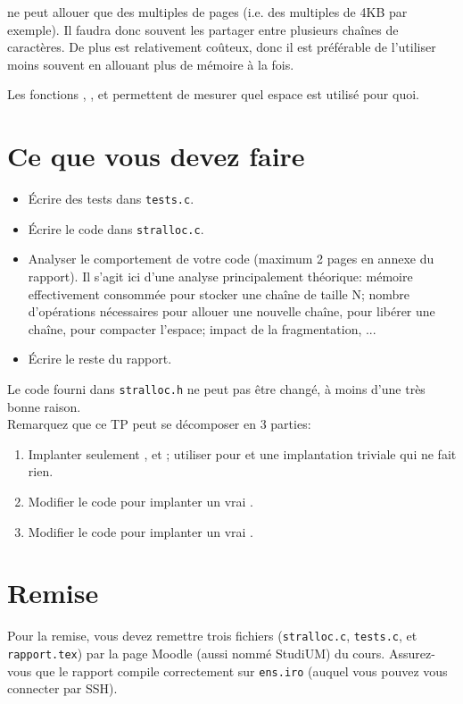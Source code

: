 \documentclass{article}
\begin{document}
 ne peut allouer que des multiples de pages (i.e. des multiples de
4KB par exemple).  Il faudra donc souvent les partager entre plusieurs
chaînes de caractères.  De plus  est relativement coûteux, donc il
est préférable de l'utiliser moins souvent en allouant plus de mémoire
à la fois.

Les fonctions , , et 
permettent de mesurer quel espace est utilisé pour quoi.

\section{Ce que vous devez faire}

\begin{itemize}
\item Écrire des tests dans \texttt{tests.c}.
\item Écrire le code dans \texttt{stralloc.c}.
\item Analyser le comportement de votre code (maximum 2 pages en annexe du
  rapport).  Il s'agit ici d'une analyse principalement théorique: mémoire
  effectivement consommée pour stocker une chaîne de taille N; nombre
  d'opérations nécessaires pour allouer une nouvelle chaîne, pour libérer
  une chaîne, pour compacter l'espace; impact de la fragmentation, ...
\item Écrire le reste du rapport.
\end{itemize}

Le code fourni dans \texttt{stralloc.h} ne peut pas être changé, à moins d'une
très bonne raison. \\
Remarquez que ce TP peut se décomposer en 3 parties:
\begin{enumerate}
\item Implanter seulement ,  et ;
  utiliser pour  et  une implantation triviale
  qui ne fait rien.
\item Modifier le code pour implanter un vrai .
\item Modifier le code pour implanter un vrai .
\end{enumerate}

\section{Remise}

Pour la remise, vous devez remettre trois fichiers (\texttt{stralloc.c},
\texttt{tests.c}, et \texttt{rapport.tex}) par la page Moodle (aussi
nommé StudiUM) du cours.  Assurez-vous que le rapport compile correctement
sur \texttt{ens.iro} (auquel vous pouvez vous connecter par SSH).
\end{document}
